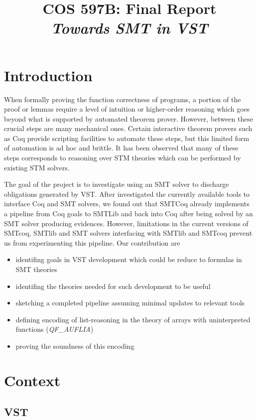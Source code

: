 \documentclass[preprint]{sigplanconf}
\title{COS 597B: Final Report\\
\emph{Towards SMT in VST}}
\begin{document}
\maketitle


\section{Introduction}
When formally proving the function correctness of programs, a portion of the proof or lemmas require a level of intuition or higher-order reasoning which goes beyond what is supported by automated theorem prover. However, between these crucial steps are many mechanical ones. Certain interactive theorem provers such as Coq provide scripting facilities to automate these steps, but this limited form of automation is ad hoc and brittle. It has been observed that many of these steps corresponds to reasoning over STM theories which can be performed by existing STM solvers. 

The goal of the project is to investigate using an SMT solver to discharge obligations generated by VST. After investigated the currently available tools to interface Coq and SMT solvers, we found out that SMTCoq already implements a pipeline from Coq goals to SMTLib and back into Coq after being solved by an SMT solver producing evidences. However, limitations in the current versions of SMTcoq, SMTlib and SMT solvers interfacing with SMTlib and SMTcoq prevent us from experimenting this pipeline. Our contribution are
\begin{itemize}
 \item identifing goals in VST development which could be reduce to formulas in SMT theories
 \item identifing the theories needed for such development to be useful
 \item sketching a completed pipeline assuming minimal updates to relevant tools
 \item defining encoding of list-reasoning in the theory of arrays with uninterpreted functions (\emph{QF\_AUFLIA})
 \item proving the soundness of this encoding
\end{itemize}

\section{Context}
\subsection{VST}
\end{document}
